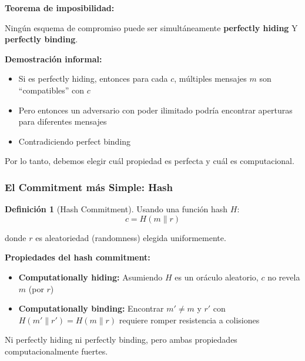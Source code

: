 \documentclass[11pt,a4paper,twoside,openright]{book}
\theoremstyle{definition}
\newtheorem{definition}{Definición}[chapter]
\theoremstyle{plain}
\theoremstyle{remark}
\begin{document}
\begin{mathnote}
\textbf{Teorema de imposibilidad:}

Ningún esquema de compromiso puede ser simultáneamente \textbf{perfectly hiding} Y \textbf{perfectly binding}.

\textbf{Demostración informal:}
\begin{itemize}
    \item Si es perfectly hiding, entonces para cada $c$, múltiples mensajes $m$ son ``compatibles'' con $c$
    \item Pero entonces un adversario con poder ilimitado podría encontrar aperturas para diferentes mensajes
    \item Contradiciendo perfect binding
\end{itemize}

Por lo tanto, debemos elegir cuál propiedad es perfecta y cuál es computacional.
\end{mathnote}

\subsubsection{El Commitment más Simple: Hash}

\begin{definition}[Hash Commitment]
Usando una función hash $H$:
\[ c = H(m \| r) \]

donde $r$ es aleatoriedad (randomness) elegida uniformemente.
\end{definition}

\begin{keyidea}
\textbf{Propiedades del hash commitment:}
\begin{itemize}
    \item \textbf{Computationally hiding:} Asumiendo $H$ es un oráculo aleatorio, $c$ no revela $m$ (por $r$)
    \item \textbf{Computationally binding:} Encontrar $m' \neq m$ y $r'$ con $H(m' \| r') = H(m \| r)$ requiere romper resistencia a colisiones
\end{itemize}

Ni perfectly hiding ni perfectly binding, pero ambas propiedades computacionalmente fuertes.
\end{keyidea}
\end{document}
